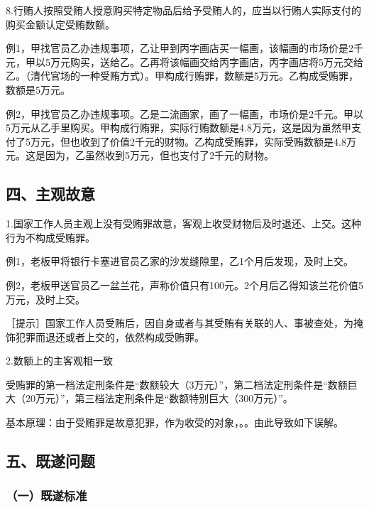 8.行贿人按照受贿人授意购买特定物品后给予受贿人的，应当以行贿人实际支付的购买金额认定受贿数额。

例1，甲找官员乙办违规事项，乙让甲到丙字画店买一幅画，该幅画的市场价是2千元，甲以5万元购买，送给乙。乙再将该幅画交给丙字画店，丙字画店将5万元交给乙。（清代官场的一种受贿方式）。甲构成行贿罪，数额是5万元。乙构成受贿罪，数额是5万元。

例2，甲找官员乙办违规事项。乙是二流画家，画了一幅画，市场价是2千元。甲以5万元从乙手里购买。甲构成行贿罪，实际行贿数额是4.8万元，这是因为虽然甲支付了5万元，但也收到了价值2千元的财物。乙构成受贿罪，实际受贿数额是4.8万元。这是因为，乙虽然收到5万元，但也支付了2千元的财物。

\subsection*{四、主观故意}

1.国家工作人员主观上没有受贿罪故意，客观上收受财物后及时退还、上交。这种行为不构成受贿罪。

例1，老板甲将银行卡塞进官员乙家的沙发缝隙里，乙1个月后发现，及时上交。

例2，老板甲送官员乙一盆兰花，声称价值只有100元。2个月后乙得知该兰花价值5万元，及时上交。

［提示］国家工作人员受贿后，因自身或者与其受贿有关联的人、事被查处，为掩饰犯罪而退还或者上交的，依然构成受贿罪。

2.数额上的主客观相一致

受贿罪的第一档法定刑条件是“数额较大（3万元）”，第二档法定刑条件是“数额巨大（20万元）”，第三档法定刑条件是“数额特别巨大（300万元）”。

基本原理：由于受贿罪是故意犯罪，作为收受的对象，。。由此导致如下误解。


\subsection*{五、既遂问题}

\subsubsection*{（一）既遂标准}

